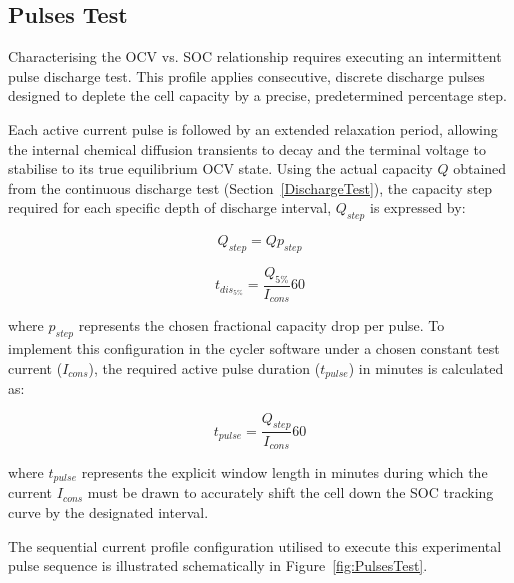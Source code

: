 \subsection{Pulses Test}\label{PulsesTest}
Characterising the \ac{OCV} vs. \ac{SOC} relationship requires executing an 
intermittent pulse discharge test. This profile applies consecutive, discrete discharge pulses designed 
to deplete the cell capacity by a precise, predetermined percentage step.

Each active current pulse is followed by an extended relaxation period, allowing the internal chemical 
diffusion transients to decay and the terminal voltage to stabilise to its true equilibrium OCV state. 
Using the actual capacity $Q$ obtained from the continuous discharge test (Section~\ref{DischargeTest}), 
the capacity step required for each specific depth of discharge interval, $Q_{step}$ is expressed by:

\begin{equation}
    Q_{step} = Q p_{step}
\end{equation}

\begin{equation}
    t_{dis_{5\%}} = \frac{Q_{5\%}}{I_{cons}}60
\end{equation}

\noindent where $p_{step}$ represents the chosen fractional capacity drop per pulse. 
To implement this configuration in the cycler software under a chosen constant test current ($I_{cons}$), 
the required active pulse duration ($t_{pulse}$) in minutes is calculated as:

\begin{equation}
    t_{pulse} = \frac{Q_{step}}{I_{cons}} 60
\end{equation}

\noindent where $t_{pulse}$ represents the explicit window length in minutes during which the current $I_{cons}$ 
must be drawn to accurately shift the cell down the \ac{SOC} tracking curve by the designated interval.

The sequential current profile configuration utilised to execute this experimental pulse sequence is illustrated 
schematically in Figure~\ref{fig:PulsesTest}.

